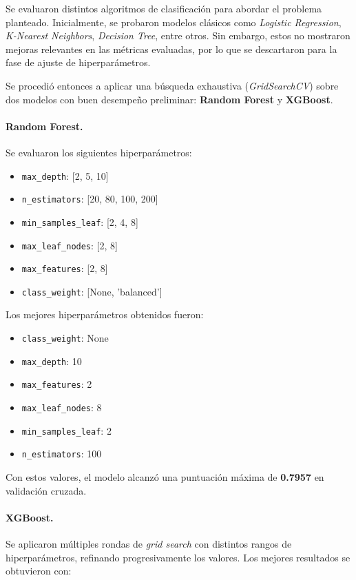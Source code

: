 \documentclass[12pt]{article}
\begin{document}
Se evaluaron distintos algoritmos de clasificación para abordar el problema planteado. Inicialmente, se probaron modelos clásicos como \textit{Logistic Regression}, \textit{K-Nearest Neighbors}, \textit{Decision Tree}, entre otros. Sin embargo, estos no mostraron mejoras relevantes en las métricas evaluadas, por lo que se descartaron para la fase de ajuste de hiperparámetros.

Se procedió entonces a aplicar una búsqueda exhaustiva (\textit{GridSearchCV}) sobre dos modelos con buen desempeño preliminar: \textbf{Random Forest} y \textbf{XGBoost}.

\paragraph{Random Forest.}
Se evaluaron los siguientes hiperparámetros:

\begin{itemize}
    \item \texttt{max\_depth}: [2, 5, 10]
    \item \texttt{n\_estimators}: [20, 80, 100, 200]
    \item \texttt{min\_samples\_leaf}: [2, 4, 8]
    \item \texttt{max\_leaf\_nodes}: [2, 8]
    \item \texttt{max\_features}: [2, 8]
    \item \texttt{class\_weight}: [None, 'balanced']
\end{itemize}

Los mejores hiperparámetros obtenidos fueron:

\begin{itemize}
    \item \texttt{class\_weight}: None
    \item \texttt{max\_depth}: 10
    \item \texttt{max\_features}: 2
    \item \texttt{max\_leaf\_nodes}: 8
    \item \texttt{min\_samples\_leaf}: 2
    \item \texttt{n\_estimators}: 100
\end{itemize}

Con estos valores, el modelo alcanzó una puntuación máxima de \textbf{0.7957} en validación cruzada.


\paragraph{XGBoost.}
Se aplicaron múltiples rondas de \textit{grid search} con distintos rangos de hiperparámetros, refinando progresivamente los valores. Los mejores resultados se obtuvieron con:
\end{document}
